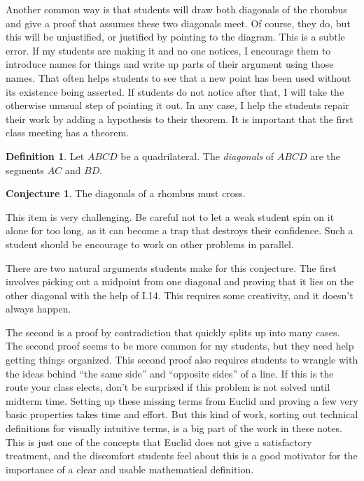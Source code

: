 \documentclass{tufte-handout}
\theoremstyle{definition}
\newtheorem{conjecture}[problem]{Conjecture}
\newtheorem*{definition}{Definition}
\begin{document}
Another common way is that students will draw both diagonals of the rhombus and give a proof that assumes these two diagonals meet. Of course, they do, but this will be unjustified, or justified by pointing to the diagram. 
This is a subtle error. If my students are making it and no 
one notices, I encourage them to introduce names for things and write up parts of their argument using those names.
That often helps students to see that a new point has been used without its existence being asserted. If students do not notice after that, I will take the otherwise unusual step of pointing it out. In any case, I help the students repair their work by adding a hypothesis to their theorem. It is important that the first class meeting has a theorem.\\

\begin{definition}\label{defn:diagonals}
Let $ABCD$ be a quadrilateral. The \emph{diagonals} of $ABCD$ are the segments $AC$ and $BD$.
\end{definition}

\begin{conjecture}
\label{conj:rhombus-diagonals}
The diagonals of a rhombus must cross.
\end{conjecture}

This item is very challenging.
Be careful not to let a weak student spin on it alone for too long, as it can become a trap that destroys their confidence.
Such a student should be encourage to work on other problems in parallel.

There are two natural arguments students make for this conjecture.
The first involves picking out a midpoint from one diagonal and proving that it lies on the other diagonal with the help of I.14.
This requires some creativity, and it doesn't always happen.

The second is a proof by contradiction that quickly splits up into many cases.
The second proof seems to be more common for my students, but they need help getting things organized.
This second proof also requires students to wrangle with the ideas behind ``the same side'' and ``opposite sides'' of a line.
If this is the route your class elects, don't be surprised if this problem is not solved until midterm time.
Setting up these missing terms from Euclid and proving a few very basic properties takes time and effort. But this kind of work, sorting out technical definitions for visually intuitive terms, is a big part of the work in these notes. This is just one of the concepts that Euclid does not give a satisfactory treatment, and the discomfort students feel about this is a good motivator for the importance of a clear and usable mathematical definition.
\end{document}

